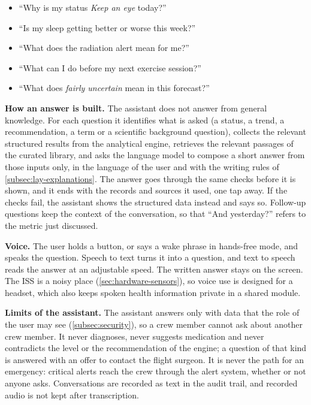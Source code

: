 \begin{itemize}
\item ``Why is my status \textit{Keep an eye} today?''
\item ``Is my sleep getting better or worse this week?''
\item ``What does the radiation alert mean for me?''
\item ``What can I do before my next exercise session?''
\item ``What does \textit{fairly uncertain} mean in this forecast?''
\end{itemize}

\medskip\noindent\textbf{How an answer is built.} The assistant does not answer from general knowledge. For each question it identifies what is asked (a status, a trend, a recommendation, a term or a scientific background question), collects the relevant structured results from the analytical engine, retrieves the relevant passages of the curated library, and asks the language model to compose a short answer from those inputs only, in the language of the user and with the writing rules of \ref{subsec:lay-explanations}. The answer goes through the same checks before it is shown, and it ends with the records and sources it used, one tap away. If the checks fail, the assistant shows the structured data instead and says so. Follow-up questions keep the context of the conversation, so that ``And yesterday?'' refers to the metric just discussed.

\medskip\noindent\textbf{Voice.} The user holds a button, or says a wake phrase in hands-free mode, and speaks the question. Speech to text turns it into a question, and text to speech reads the answer at an adjustable speed. The written answer stays on the screen. The ISS is a noisy place (\ref{sec:hardware-sensors}), so voice use is designed for a headset, which also keeps spoken health information private in a shared module.

\medskip\noindent\textbf{Limits of the assistant.} The assistant answers only with data that the role of the user may see (\ref{subsec:security}), so a crew member cannot ask about another crew member. It never diagnoses, never suggests medication and never contradicts the level or the recommendation of the engine; a question of that kind is answered with an offer to contact the flight surgeon. It is never the path for an emergency: critical alerts reach the crew through the alert system, whether or not anyone asks. Conversations are recorded as text in the audit trail, and recorded audio is not kept after transcription.

